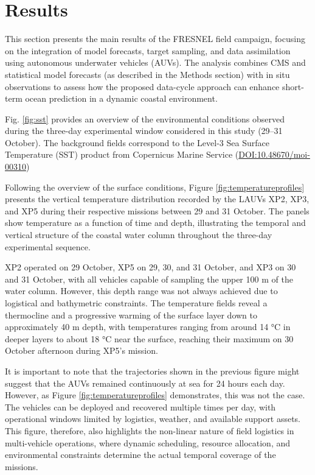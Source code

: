 \section{Results}
\label{sec:results}

This section presents the main results of the FRESNEL field campaign,
focusing on the integration of model forecasts, target sampling, and
data assimilation using autonomous underwater vehicles (AUVs). The
analysis combines CMS and statistical model forecasts (as described
in the Methods section) with in situ observations to assess how the
proposed data-cycle approach can enhance short-term ocean prediction
in a dynamic coastal environment.

Fig. \ref{fig:sst} provides an overview of the environmental
conditions observed during the three-day experimental window
considered in this study (29–31 October). The background fields
correspond to the Level-3 Sea Surface Temperature (SST) product from
Copernicus Marine Service (\url{DOI:10.48670/moi-00310})

Following the overview of the surface conditions, Figure \ref{fig:temperatureprofiles} presents the vertical temperature distribution recorded by the LAUVs XP2, XP3, and XP5 during their respective missions between 29 and 31 October. The panels show temperature as a function of time and depth, illustrating the temporal and vertical structure of the coastal water column throughout the three-day experimental sequence.

XP2 operated on 29 October, XP5 on 29, 30, and 31 October, and XP3 on 30 and 31 October, with all vehicles capable of sampling the upper 100 m of the water column. However, this depth range was not always achieved due to logistical and bathymetric constraints. The temperature fields reveal a thermocline and a progressive warming of the surface layer down to approximately 40 m depth, with temperatures ranging from around 14 °C in deeper layers to about 18 °C near the surface, reaching their maximum on 30 October afternoon during XP5’s mission.

It is important to note that the trajectories shown in the previous figure might suggest that the AUVs remained continuously at sea for 24 hours each day. However, as Figure \ref{fig:temperatureprofiles} demonstrates, this was not the case. The vehicles can be deployed and recovered multiple times per day, with operational windows limited by logistics, weather, and available support assets. This figure, therefore, also highlights the non-linear nature of field logistics in multi-vehicle operations, where dynamic scheduling, resource allocation, and environmental constraints determine the actual temporal coverage of the missions.

